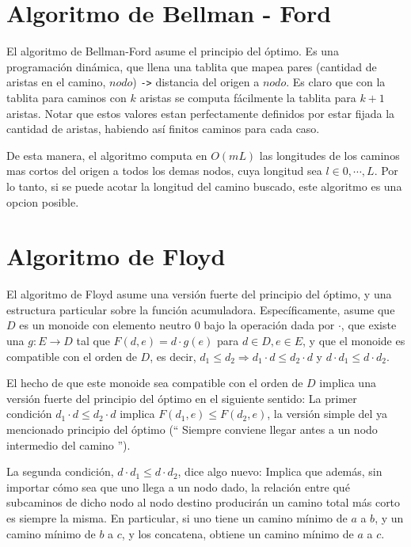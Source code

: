 \documentclass{article}
\begin{document}
\section{Algoritmo de Bellman - Ford}

El algoritmo de Bellman-Ford asume el principio del óptimo. Es una programación dinámica, que llena una tablita
que mapea pares (cantidad de aristas en el camino, $nodo$) \texttt{->} distancia del origen a $nodo$. Es claro que con
la tablita para caminos con $k$ aristas se computa fácilmente la tablita para $k+1$ aristas. Notar que estos
valores estan perfectamente definidos por estar fijada la cantidad de aristas, habiendo así finitos caminos
para cada caso.

De esta manera, el algoritmo computa en $O(mL)$ las longitudes de los caminos mas cortos del origen a todos los
demas nodos, cuya longitud sea $l \in {0,\cdots, L}$. Por lo tanto, si se puede acotar la longitud del camino
buscado, este algoritmo es una opcion posible.

\section{Algoritmo de Floyd}

El algoritmo de Floyd asume una versión fuerte del principio del óptimo, y una estructura particular sobre la
función acumuladora. Específicamente, asume que $D$ es un monoide con elemento neutro $0$ bajo la operación
dada por $\cdot$, que existe una $g : E \rightarrow D$ tal que $F(d,e) = d \cdot g(e)$ para $d \in D, e \in E$, y
que el monoide es compatible con el orden de $D$, es decir, 
$d_1 \leq d_2 \Rightarrow d_1 \cdot d \leq d_2 \cdot d$ y $d \cdot d_1 \leq d \cdot d_2$.

El hecho de que este monoide sea compatible con el orden de $D$ implica una versión fuerte del principio del óptimo
en el siguiente sentido: La primer condición $d_1 \cdot d \leq d_2 \cdot d$ implica $F(d_1,e) \leq F(d_2,e)$, la
versión simple del ya mencionado principio del óptimo (`` Siempre conviene llegar antes a un nodo intermedio del camino '').

La segunda condición, $d \cdot d_1 \leq d \cdot d_2$, dice algo nuevo: Implica que además, sin importar cómo sea
que uno llega a un nodo dado, la relación entre qué subcaminos de dicho nodo al nodo destino producirán un camino
total más corto es siempre la misma. En particular, si uno tiene un camino mínimo de $a$ a $b$, y un camino mínimo
de $b$ a $c$, y los concatena, obtiene un camino mínimo de $a$ a $c$.
\end{document}
